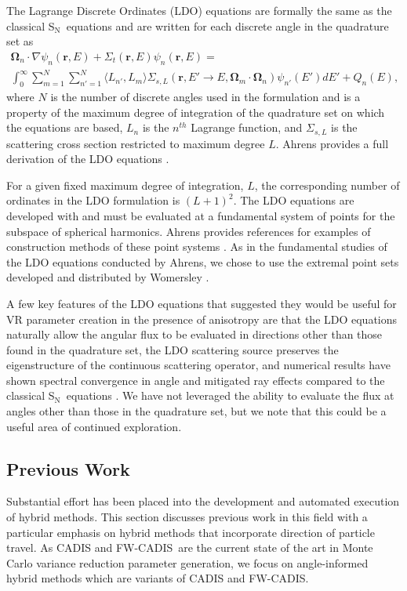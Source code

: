 \documentclass{article} %
\newcommand{\bo}{\mathbf\Omega}
\newcommand{\vecr}{\textbf{r}}
\newcommand{\sn}{S$_\mathrm{N}$}
\newcommand{\fwc}{\mbox{FW-CADIS}}
\begin{document}
The Lagrange Discrete Ordinates (LDO) equations are formally the same as the
classical \sn\ equations and are written for each discrete angle in the quadrature
set as
%
\begin{multline}
\bo_n\cdot\nabla\psi_{n}(\vecr,E) + 
\Sigma_{t}(\vecr,E)\psi_{n}(\vecr,E) = \\
\int_0^\infty\sum_{m=1}^{N}\sum_{n'=1}^{N}\langle L_{n'},L_{m}\rangle
\Sigma_{s,L}(\vecr,E'\rightarrow E,\bo_{m}\cdot\bo_n)\psi_{n'}(E')dE'
+ Q_{n}(E),
\end{multline}
%
where $N$ is the number of discrete angles used in the formulation
and is a property of the maximum degree of integration of the quadrature set
on which the equations are based, $L_n$ is the $n^{th}$ Lagrange function, and
$\Sigma_{s,L}$ is the scattering cross section restricted to maximum degree
$L$. Ahrens provides a full derivation of the LDO equations \cite{ahrens}.

For a given fixed maximum degree of integration, $L$, the corresponding number
of ordinates in the LDO formulation is $(L+1)^2$. The LDO equations are
developed with and must be evaluated at a fundamental system of points for the
subspace of spherical harmonics. Ahrens provides references for examples of
construction methods of these point systems \cite{ahrens}. As in the
fundamental studies of the LDO equations conducted by Ahrens, we chose to use
the extremal point sets developed and distributed by Womersley \cite{wom}.

A few key features of the LDO equations that suggested they would be useful for
VR parameter creation in the presence of anisotropy are that the LDO equations
naturally allow the angular flux to be evaluated in directions other than those
found in the quadrature set, the LDO scattering source preserves the
eigenstructure of the continuous scattering operator, and numerical results have
shown spectral convergence in angle and mitigated ray effects compared to the
classical \sn\ equations \cite{ahrens}. We have not leveraged the ability to
evaluate the flux at angles other than those in the quadrature set, but we note
that this could be a useful area of continued exploration.

\subsection{Previous Work}

Substantial effort has been placed into the development and automated
execution of hybrid methods. This section discusses previous work in this
field with a particular emphasis on hybrid methods that incorporate
direction of particle travel. As CADIS and \fwc\ are the current state of the
art in Monte Carlo variance reduction parameter generation, we focus on
angle-informed hybrid methods which are variants of CADIS and \fwc.
\end{document}

